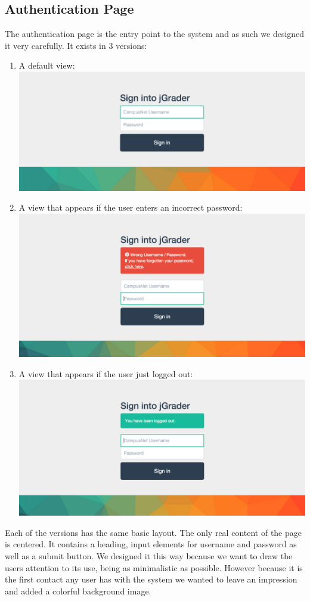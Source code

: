 \subsection{Authentication Page}

The authentication page is the entry point to the system and as such we designed it very carefully. It exists in 3 versions:
\begin{enumerate}
  \item A default view:
  	\subitem \includegraphics[width=.55\textwidth]{screenshots/SignIn.png}
  \item A view that appears if the user enters an incorrect password: 
   	\subitem \includegraphics[width=.55\textwidth]{screenshots/WrongPW.png}
  \item A view that appears if the user just logged out: 
   	\subitem \includegraphics[width=.55\textwidth]{screenshots/LogOut.png}
\end{enumerate}
\newpage

Each of the versions has the same basic layout. The only real content of the page is centered. It contains a heading, input elements for username and password as well as a submit button. We designed it this way because we want to draw the users attention to its use, being as minimalistic as possible. However because it is the first contact any user has with the system we wanted to leave an impression and added a colorful background image.

